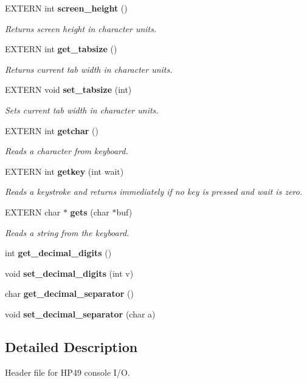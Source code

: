 \begin{CompactItemize}
EXTERN int {\bf screen\_\-height} ()
\begin{CompactList}\small\item\em Returns screen height in character units.\item\end{CompactList}\item 
EXTERN int {\bf get\_\-tabsize} ()
\begin{CompactList}\small\item\em Returns current tab width in character units.\item\end{CompactList}\item 
EXTERN void {\bf set\_\-tabsize} (int)
\begin{CompactList}\small\item\em Sets current tab width in character units.\item\end{CompactList}\item 
EXTERN int {\bf getchar} ()
\begin{CompactList}\small\item\em Reads a character from keyboard.\item\end{CompactList}\item 
EXTERN int {\bf getkey} (int wait)
\begin{CompactList}\small\item\em Reads a keystroke and returns immediately if no key is pressed and {\em wait} is zero.\item\end{CompactList}\item 
EXTERN char $\ast$ {\bf gets} (char $\ast$buf)
\begin{CompactList}\small\item\em Reads a string from the keyboard.\item\end{CompactList}\item 
int {\bf get\_\-decimal\_\-digits} ()
\item 
void {\bf set\_\-decimal\_\-digits} (int v)
\item 
char {\bf get\_\-decimal\_\-separator} ()
\item 
void {\bf set\_\-decimal\_\-separator} (char a)
\end{CompactItemize}


\subsection{Detailed Description}
Header file for HP49 console I/O.





